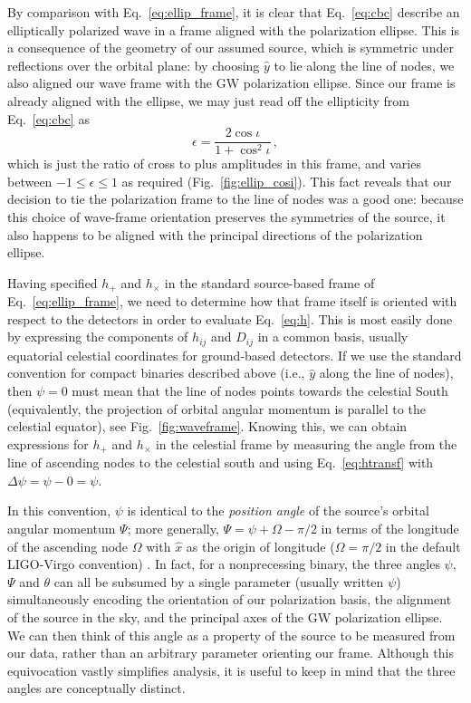 \documentclass[aps,prd,twocolumn,superscriptaddress,preprintnumbers,floatfix,nofootinbib]{revtex4-2}
\newcommand{\beq}{\begin{equation}}
\newcommand{\eeq}{\end{equation}}
\newcommand*{\eq}[1]{Eq.~\eqref{eq:#1}}
\newcommand*{\red}[1]{#1}
\newcommand*{\red}[1]{{\color{purple} #1}}
\begin{document}
By comparison with Eq.~\eqref{eq:ellip_frame}, it is clear that Eq.~\eqref{eq:cbc} describe an elliptically polarized wave in a frame aligned with the polarization ellipse.
This is a consequence of the geometry of our assumed source, which is symmetric under reflections over the orbital plane: by choosing $\hat{y}$ to lie along the line of nodes, we also aligned our wave frame with the GW polarization ellipse.
Since our frame is already aligned  with the ellipse, we may just read off the ellipticity from Eq.~\eqref{eq:cbc} as
\beq \label{eq:ellip_cosi}
\epsilon = \frac{2 \cos\iota}{1 + \cos^2\iota}\, ,
\eeq
which is just the ratio of cross to plus amplitudes in this frame, and varies between $-1 \leq \epsilon \leq 1$ as required (Fig.~\ref{fig:ellip_cosi}).
This fact reveals that our decision to tie the polarization frame to the line of nodes was a good one: because this choice of wave-frame orientation preserves the symmetries of the source, it also happens to be aligned with the principal directions of the polarization ellipse.

Having specified $h_+$ and $h_\times$ in the standard source-based frame of Eq.~\eqref{eq:ellip_frame}, we need to determine how that frame itself is oriented with respect to the detectors in order to evaluate \eq{h}.
This is most easily done by expressing the components of $h_{ij}$ and $D_{ij}$ in a common basis, usually equatorial celestial coordinates for ground-based detectors.
If we use the standard convention for compact binaries described above (i.e., $\hat{y}$ along the line of nodes), then $\psi = 0$ must mean that the line of nodes points towards the celestial South \cite{LALSuite:source} (equivalently, the projection of orbital angular momentum is parallel to the celestial equator), see  Fig.~\ref{fig:waveframe}.
Knowing this, we can obtain expressions for $h_+$ and $h_\times$ in the celestial frame by measuring the angle from the line of ascending nodes to the celestial south and using \eq{htransf} with $\Delta\psi = \psi - 0 =\psi$.

In this convention, $\psi$ is identical to the \emph{position angle} of the source's orbital angular momentum $\Psi$; more generally, $\Psi = \psi \red{+} \Omega \red{-} \pi/2$ in terms of the longitude of the ascending node $\Omega$ with $\hat{x}$ as the origin of longitude ($\Omega = \pi/2$ in the default LIGO-Virgo convention) \cite{LALSuite:source}.
In fact, for a nonprecessing binary, the three angles $\psi$, $\Psi$ and $\theta$ can all be subsumed by a single parameter (usually written $\psi$) simultaneously encoding the orientation of our polarization basis, the alignment of the source in the sky, and the principal axes of the GW polarization ellipse.
We can then think of this angle as a property of the source to be measured from our data, rather than an arbitrary parameter orienting our frame.
Although this equivocation vastly simplifies analysis, it is useful to keep in mind that the three angles are conceptually distinct.
\end{document}
